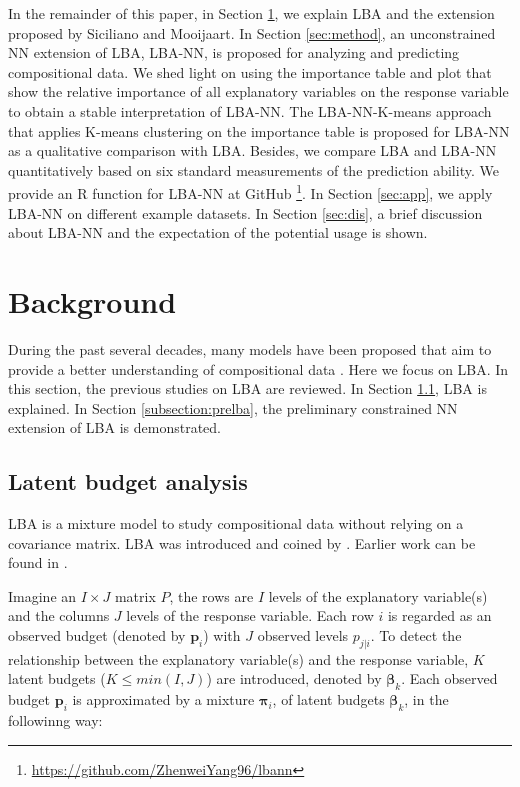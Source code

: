 \documentclass[]{interact}
\theoremstyle{plain}%
\theoremstyle{definition}
\theoremstyle{remark}
\begin{document}
In the remainder of this paper, in Section \ref{sec:bg}, we explain LBA
and the extension proposed by Siciliano and Mooijaart. In Section
\ref{sec:method}, an unconstrained NN extension of LBA, LBA-NN, is
proposed for analyzing and predicting compositional data. We shed light
on using the importance table and plot that show the relative importance
of all explanatory variables on the response variable to obtain a stable
interpretation of LBA-NN. The LBA-NN-K-means approach that applies
K-means clustering on the importance table is proposed for LBA-NN as a
qualitative comparison with LBA. Besides, we compare LBA and LBA-NN
quantitatively based on six standard measurements of the prediction
ability. We provide an R function for LBA-NN at GitHub
\footnote{\label{footnote:lbann} \url{https://github.com/ZhenweiYang96/lbann}}.
In Section \ref{sec:app}, we apply LBA-NN on different example datasets.
In Section \ref{sec:dis}, a brief discussion about LBA-NN and the
expectation of the potential usage is shown.

\hypertarget{sec:bg}{%
\section{Background}\label{sec:bg}}

During the past several decades, many models have been proposed that aim
to provide a better understanding of compositional data
\citep{desarbo1993, hsu2019}. Here we focus on LBA. In this section, the
previous studies on LBA are reviewed. In Section \ref{subsection:lba},
LBA is explained. In Section \ref{subsection:prelba}, the preliminary
constrained NN extension of LBA is demonstrated.

\hypertarget{subsection:lba}{%
\subsection{Latent budget analysis}\label{subsection:lba}}

LBA is a mixture model to study compositional data without relying on a
covariance matrix. LBA was introduced and coined by \cite{devan1988}.
Earlier work can be found in \cite{goodman1974}.

Imagine an \(I \times J\) matrix \(P\), the rows are \(I\) levels of the
explanatory variable(s) and the columns \(J\) levels of the response
variable. Each row \(i\) is regarded as an observed budget (denoted by
\(\bm{p}_i\)) with \(J\) observed levels \(p_{j|i}\). To detect the
relationship between the explanatory variable(s) and the response
variable, \(K\) latent budgets (\(K \leq min(I,J)\)) are introduced,
denoted by \(\boldsymbol\beta_k\). Each observed budget \(\bm{p}_i\) is
approximated by a mixture \(\boldsymbol\pi_i\), of latent budgets
\(\boldsymbol\beta_k\), in the followinng way:
\end{document}
